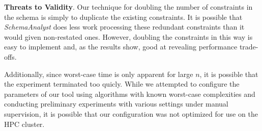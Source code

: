 

\textbf{Threats to Validity}. Our technique for doubling the number of constraints in the schema is simply to duplicate
the existing constraints. It is possible that \textit{SchemaAnalyst} does less work processing these redundant
constraints than it would given non-restated ones. However, doubling the constraints in this way is easy to
implement and, as the results show, good at revealing performance trade-offs.

Additionally, since worst-case time is only apparent for large $n$, it is possible that the experiment terminated too
quicly.  While we attempted to configure the parameters of our tool using algorithms with known worst-case complexities
and conducting preliminary experiments with various settings under manual supervision, it is possible that our
configuration was not optimized for use on the HPC cluster.

